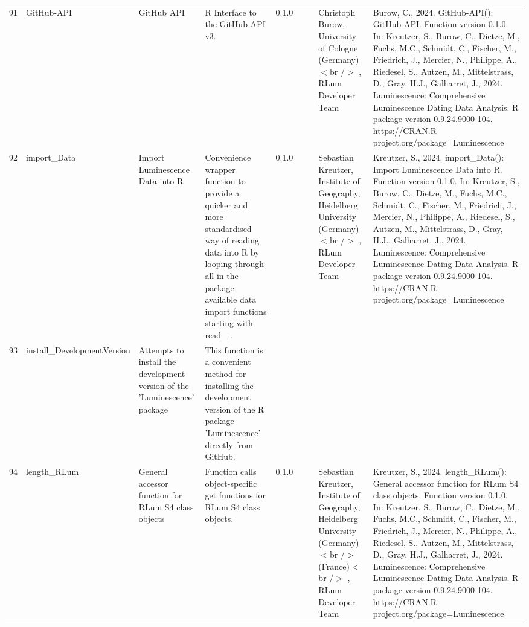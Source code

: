 \begin{table}[ht]
\begin{tabular}{rllllllll}
 \\ 
  91 & GitHub-API & GitHub API & R Interface to the GitHub API v3. & 0.1.0
 &  &  & Christoph Burow, University of Cologne (Germany)$<$br /$>$ , RLum Developer Team & Burow, C., 2024. GitHub-API(): GitHub API. Function version 0.1.0. In: Kreutzer, S., Burow, C., Dietze, M., Fuchs, M.C., Schmidt, C., Fischer, M., Friedrich, J., Mercier, N., Philippe, A., Riedesel, S., Autzen, M., Mittelstrass, D., Gray, H.J., Galharret, J., 2024. Luminescence: Comprehensive Luminescence Dating Data Analysis. R package version 0.9.24.9000-104. https://CRAN.R-project.org/package=Luminescence
 \\ 
  92 & import\_Data & Import Luminescence Data into R & Convenience wrapper function to provide a quicker and more standardised way of reading data into R by looping through all in the package available data import functions starting with  read\_ . & 0.1.0
 &  &  & Sebastian Kreutzer, Institute of Geography, Heidelberg University (Germany)$<$br /$>$ , RLum Developer Team & Kreutzer, S., 2024. import\_Data(): Import Luminescence Data into R. Function version 0.1.0. In: Kreutzer, S., Burow, C., Dietze, M., Fuchs, M.C., Schmidt, C., Fischer, M., Friedrich, J., Mercier, N., Philippe, A., Riedesel, S., Autzen, M., Mittelstrass, D., Gray, H.J., Galharret, J., 2024. Luminescence: Comprehensive Luminescence Dating Data Analysis. R package version 0.9.24.9000-104. https://CRAN.R-project.org/package=Luminescence
 \\ 
  93 & install\_DevelopmentVersion & Attempts to install the development version of the 'Luminescence' package & This function is a convenient method for installing the development version of the R package 'Luminescence' directly from GitHub. &  &  &  &  &  \\ 
  94 & length\_RLum & General accessor function for RLum S4 class objects & Function calls object-specific get functions for RLum S4 class objects. & 0.1.0
 &  &  & Sebastian Kreutzer, Institute of Geography, Heidelberg University (Germany)$<$br /$>$ (France)$<$br /$>$ , RLum Developer Team & Kreutzer, S., 2024. length\_RLum(): General accessor function for RLum S4 class objects. Function version 0.1.0. In: Kreutzer, S., Burow, C., Dietze, M., Fuchs, M.C., Schmidt, C., Fischer, M., Friedrich, J., Mercier, N., Philippe, A., Riedesel, S., Autzen, M., Mittelstrass, D., Gray, H.J., Galharret, J., 2024. Luminescence: Comprehensive Luminescence Dating Data Analysis. R package version 0.9.24.9000-104. https://CRAN.R-project.org/package=Luminescence
 \\ 

\end{tabular}
\end{table}
